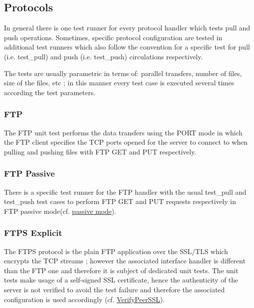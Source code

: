 \documentclass[dec_sum_main.tex]{subfiles}
\begin{document}
 \newline

\subsection{Protocols}
In general there is one test runner for every protocol handler which tests pull and push operations. Sometimes, specific protocol configuration are tested in additional test runners which also follow the convention for a specific test for pull (i.e. test\_pull) and push (i.e. test\_push) circulations respectively.

The tests are usually parametric in terms of: 
parallel transfers, number of files, size of the files, etc ; in this manner every test case is executed several times according the test parameters.

\subsubsection{FTP}
The FTP unit test performs the data transfers using the PORT mode in which the FTP client specifies the TCP ports opened for the server to connect to when pulling and pushing files with FTP GET and PUT respectively. \newline

 \newline

 \newline

\subsubsection{FTP Passive}
There is a specific test runner for the FTP handler with the usual test\_pull and test\_push test cases to perform FTP GET and PUT requests respectively in FTP passive mode(cf. \hyperref[PassiveFlag]{passive mode}).\newline

 \newline

 \newline

\subsubsection{FTPS Explicit}
The FTPS protocol is the plain FTP application over the SSL/TLS which encrypts the TCP streams ; however the associated interface handler is different than the FTP one and therefore it is subject of dedicated unit tests. The unit tests make usage of a self-signed SSL certificate, hence the authenticity of the server is not verified to avoid the test failure and therefore the associated configuration is used accordingly (cf. \hyperref[VerifyPeerSSL]{VerifyPeerSSL}). \newline
\end{document}

